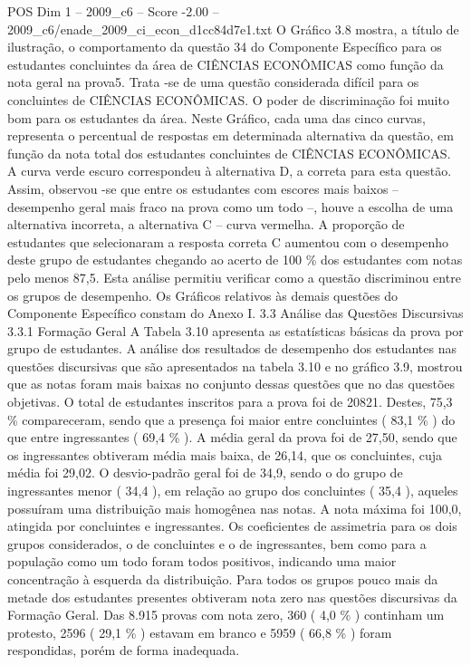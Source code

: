 \begin{textsample}{POS Dim 1 – 2009\_c6 – Score -2.00 – 2009\_c6/enade\_2009\_ci\_econ\_d1cc84d7e1.txt}
O Gráfico 3.8 mostra, a título de ilustração, o comportamento da questão 34 do Componente Específico para os estudantes concluintes da área de CIÊNCIAS ECONÔMICAS como função da nota geral na prova5.
Trata -se de uma questão considerada difícil para os concluintes de CIÊNCIAS ECONÔMICAS.
O poder de discriminação foi muito bom para os estudantes da área.
Neste Gráfico, cada uma das cinco curvas, representa o percentual de respostas em determinada alternativa da questão, em função da nota total dos estudantes concluintes de CIÊNCIAS ECONÔMICAS.
A curva verde escuro correspondeu à alternativa D, a correta para esta questão.
Assim, observou -se que entre os estudantes com escores mais baixos – desempenho geral mais fraco na prova como um todo –, houve a escolha de uma alternativa incorreta, a alternativa C – curva vermelha.
A proporção de estudantes que selecionaram a resposta correta C aumentou com o desempenho deste grupo de estudantes chegando ao acerto de 100 \% dos estudantes com notas pelo menos 87,5.
Esta análise permitiu verificar como a questão discriminou entre os grupos de desempenho.
Os Gráficos relativos às demais questões do Componente Específico constam do Anexo I. 3.3 Análise das Questões Discursivas 3.3.1 Formação Geral A Tabela 3.10 apresenta as estatísticas básicas da prova por grupo de estudantes.
A análise dos resultados de desempenho dos estudantes nas questões discursivas que são apresentados na tabela 3.10 e no gráfico 3.9, mostrou que as notas foram mais baixas no conjunto dessas questões que no das questões objetivas.
O total de estudantes inscritos para a prova foi de 20821.
Destes, 75,3 \% compareceram, sendo que a presença foi maior entre concluintes ( 83,1 \% ) do que entre ingressantes ( 69,4 \% ).
A média geral da prova foi de 27,50, sendo que os ingressantes obtiveram média mais baixa, de 26,14, que os concluintes, cuja média foi 29,02.
O desvio-padrão geral foi de 34,9, sendo o do grupo de ingressantes menor ( 34,4 ), em relação ao grupo dos concluintes ( 35,4 ), aqueles possuíram uma distribuição mais homogênea nas notas.
A nota máxima foi 100,0, atingida por concluintes e ingressantes.
Os coeficientes de assimetria para os dois grupos considerados, o de concluintes e o de ingressantes, bem como para a população como um todo foram todos positivos, indicando uma maior concentração à esquerda da distribuição.
Para todos os grupos pouco mais da metade dos estudantes presentes obtiveram nota zero nas questões discursivas da Formação Geral.
Das 8.915 provas com nota zero, 360 ( 4,0 \% ) continham um protesto, 2596 ( 29,1 \% ) estavam em branco e 5959 ( 66,8 \% ) foram respondidas, porém de forma inadequada.

\end{textsample}
